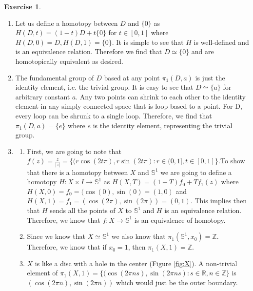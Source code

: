 \documentclass[11pt, letter]{amsart}
\theoremstyle{definition}
\newtheorem{exercise}{Exercise}[]
\begin{document}
\begin{exercise}
\end{exercise}
\begin{enumerate}
    \item 

    Let us define a homotopy between $D$ and $\{0\}$ as $H(D, t) = (1 - t)D + t\{0\}$ for $t\in [0, 1]$ where $H(D, 0) = D, H(D, 1) = \{0\}$. It is simple to see that $H$ is well-defined and is an equivalence relation. Therefore we find that $D \simeq \{0\}$ and are homotopically equivalent as desired.

    \item 

    The fundamental group of $D$ based at any point $\pi_1(D, a)$ is just the identity element, i.e. the trivial group. It is easy to see that $D \simeq \{a\}$ for arbitrary constant $a$. Any two points can shrink to each other to the identity element in any simply connected space that is loop based to a point. For D, every loop can be shrunk to a single loop. Therefore, we find that $\pi_1(D, a) = \{e\}$ where $e$ is the identity element, representing the trivial group.

    \item 

    \begin{enumerate}
        \item 

        First, we are going to note that $f(z) = \frac{z}{|z|} = \{(r\cos(2t\pi), r\sin(2t\pi): r\in (0, 1], t\in [0, 1]\}$.To show that there is a homotopy between $X$ and $\mathbb{S}^1$ we are going to define a homotopy $H: X \times I \rightarrow \mathbb{S}^1$ as $H(X, T) = (1 - T)f_0 + Tf_1(z)$ where $H(X, 0) = f_0 = (\cos(0), \sin(0) = (1, 0)$ and $H(X, 1) = f_1 = (\cos(2\pi), \sin(2\pi)) = (0, 1).$ This implies then that $H$ sends all the points of $X$ to $\mathbb{S}^1$ and $H$ is an equivalence relation. Therefore, we know that $f: X \rightarrow \mathbb{S}^1$ is an equivalence of homotopy.

        \item 

        Since we know that $X \simeq \mathbb{S}^1$ we also know that $\pi_1(\mathbb{S}^1, x_0) = \mathbb{Z}$. Therefore, we know that if $x_0 = 1$, then $\pi_1(X, 1) = \mathbb{Z}$.

        \item 

        $X$ is like a disc with a hole in the center (Figure \ref{fig:X}). A non-trivial element of $\pi_1(X, 1) = \{(\cos(2\pi ns), \sin(2\pi ns): s\in \mathbb{R}, n\in \mathbb{Z}\}$ is $(\cos(2\pi n), \sin(2\pi n))$ which would just be the outer boundary.
        
    \end{enumerate}
\end{enumerate}
\end{document}
